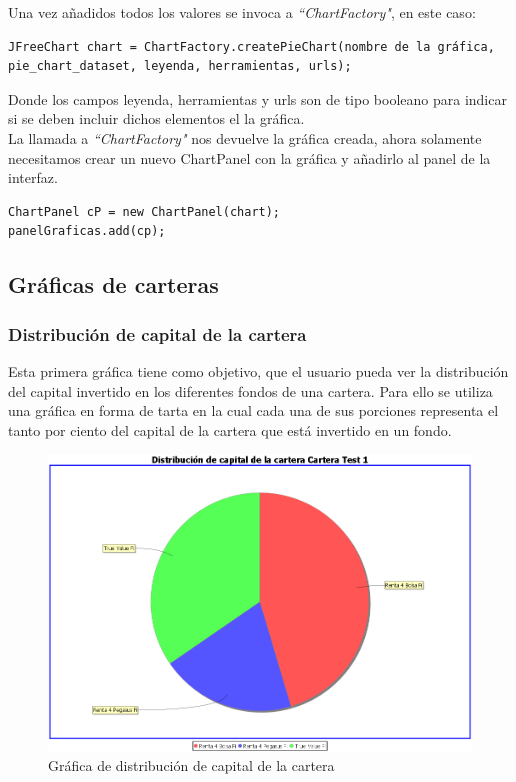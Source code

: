 \documentclass[12pt, a4paper]{article}
\begin{document}
Una vez añadidos todos los valores se invoca a \textit{``ChartFactory"}, en este caso: 

\begin{verbatim}
JFreeChart chart = ChartFactory.createPieChart(nombre de la gráfica,
pie_chart_dataset, leyenda, herramientas, urls);
\end{verbatim}

Donde los campos leyenda, herramientas y urls son de tipo booleano para indicar si se deben incluir dichos elementos el la gráfica.\\

La llamada a \textit{``ChartFactory"} nos devuelve la gráfica creada, ahora solamente necesitamos crear un nuevo ChartPanel con la gráfica y añadirlo al panel de la interfaz.

\begin{verbatim}
ChartPanel cP = new ChartPanel(chart);
panelGraficas.add(cp);
\end{verbatim}
\newpage

\subsection{Gráficas de carteras}

\subsubsection{Distribución de capital de la cartera}

Esta primera gráfica tiene como objetivo, que el usuario pueda ver la distribución del capital invertido en los diferentes fondos de una cartera. Para ello se utiliza una gráfica en forma de tarta en la cual cada una de sus porciones representa el tanto por ciento del capital de la cartera que está invertido en un fondo.\\

	\begin{figure}[htbp]
	\centering
	\includegraphics[width=\textwidth]{figuras/distribucion.PNG}
	\caption{Gráfica de distribución de capital de la cartera}
	\label{fig:distribucion}
	\end {figure}
	
\end{document}
